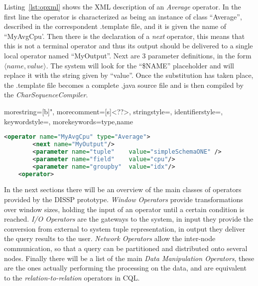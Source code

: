  
 Listing~\ref{lst:opxml} shows the XML description of an \textit{Average} operator. In the first line the
operator is characterized as being an instance of class ``Average'', described in the correspondent
.template file, and it is given the name of ``MyAvgCpu'. Then there is the declaration of a \textit{next}
operator, this means that this is not a terminal operator and thus its output should be delivered to a
single local operator named ``MyOutput''. Next are 3 parameter definitions, in the form $\langle name,
value \rangle$. The system will look for the ``\$NAME'' placeholder and will replace it with the string
given by ``value''. Once the substitution has taken place, the .template file becomes a complete .java
source file and is then compiled by the \textit{CharSequenceCompiler}.
		 

{
  morestring=[b]",
  morecomment=[s]{<?}{?>},
  stringstyle=\color{BrickRed},
  identifierstyle=\color{NavyBlue},
  keywordstyle=\color{ForestGreen}, 
  morekeywords={type,name}%
}
\noindent\begin{minipage}{\textwidth}
\begin{lstlisting}[language=XML,label=lst:opxml,caption=XML description of an Average operator]
	<operator name="MyAvgCpu" type="Average">
	    <next name="MyOutput"/>
	    <parameter name="tuple"    value="simpleSchemaONE" />
	    <parameter name="field"    value="cpu"/>
	    <parameter name="groupby"  value="idx"/>
	<operator>
\end{lstlisting}
\end{minipage}

In the next sections there will be an overview of the main classes of operators provided by the DISSP
prototype. \textit{Window Operators} provide transformations over window sizes, holding the input of an
operator until a certain condition is reached. \textit{I/O Operators} are the gateways to the system, in
input they provide the conversion from external to system tuple representation, in output they deliver
the query results to the user. \textit{Network Operators} allow the inter-node communication, so that a
query can be partitioned and distributed onto several nodes. Finally there will be a list of the main
\textit{Data Manipulation Operators}, these are the ones actually performing the processing on the data,
and are equivalent to the \textit{relation-to-relation} operators in CQL.

